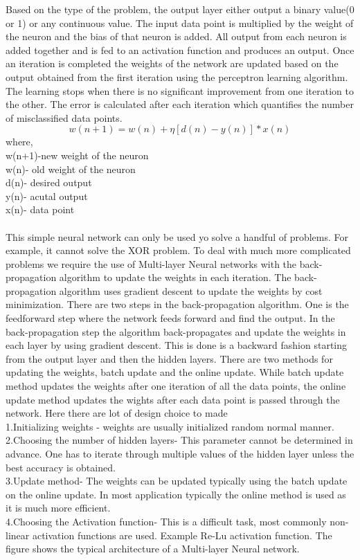 \documentclass[sigconf]{acmart}
\begin{document}
Based on the type of the problem, the output layer either output a binary value(0 or 1) or any continuous value. The input data point is multiplied by the weight of the neuron and the bias of that neuron is added. All output from each neuron is added together and is fed to an activation function and produces an output. Once an iteration is completed the weights of the network are updated based on the output obtained from the first iteration using the perceptron learning algorithm. The learning stops when there is no significant improvement from one iteration to the other. The error is calculated after each iteration which quantifies the number of misclassified data points.
\cite{Williamson1}
\begin{equation}
   w(n+1) = w(n) + \eta[d(n)-y(n)]*x(n)
\end{equation}
where,\\
w(n+1)-new weight of the neuron\\
w(n)- old weight of the neuron\\
d(n)- desired output\\
y(n)- acutal output\\
x(n)- data point\\\\

This simple neural network can only be used yo solve a handful of problems. For example, it cannot solve the XOR problem. To deal with much more complicated problems we require the use of Multi-layer Neural networks with the back-propagation algorithm to update the weights in each iteration. The back-propagation algorithm uses gradient descent to update the weights by cost minimization. There are two steps in the back-propagation algorithm. One is the feedforward step where the network feeds forward and find the output. In the back-propagation step the algorithm back-propagates and update the weights in each layer by using gradient descent. This is done is a backward fashion starting from the output layer and then the hidden layers. There are two methods for updating the weights, batch update and the online update. While batch update method updates the weights after one iteration of all the data points, the online update method updates the wights after each data point is passed through the network.
\cite{Williamson1}
Here there are lot of design choice to made\\
1.Initializing weights - weights are usually initialized random normal manner. \\
2.Choosing the number of hidden layers- This parameter cannot be determined in advance. One has to iterate through multiple values of the hidden layer unless the best accuracy is obtained.\\
3.Update method- The weights can be updated typically using the batch update on the online update. In most application typically the online method is used as it is much more efficient.\\
4.Choosing the Activation function- This is a difficult task, most commonly non-linear activation functions are used. Example Re-Lu activation function.
\cite{Williamson1}
The figure shows the typical architecture of a Multi-layer Neural network. 
\end{document}
